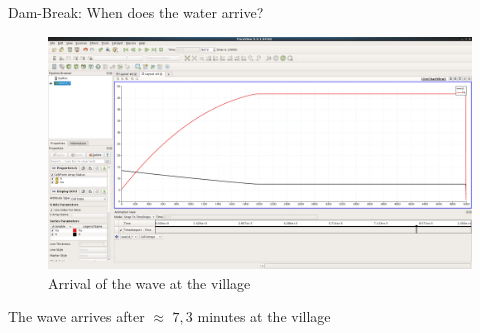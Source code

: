 \documentclass[shortpres]{beamer}
\newcommand{\imgvoffset}{-20pt}
\newcommand{\imgfullscale}{0.75}
\begin{document}
\begin{frame}{Dam-Break: When does the water arrive?}
	\begin{figure}[t]
		\vspace{\imgvoffset}
		\includegraphics[width=\imgfullscale\linewidth]{img/4_dorf_arrival_as_graph.png}
		\caption*{Arrival of the wave at the village}
	\end{figure}
	The wave arrives after $\approx$ $7,3$ minutes at the village
\end{frame}
\end{document}
